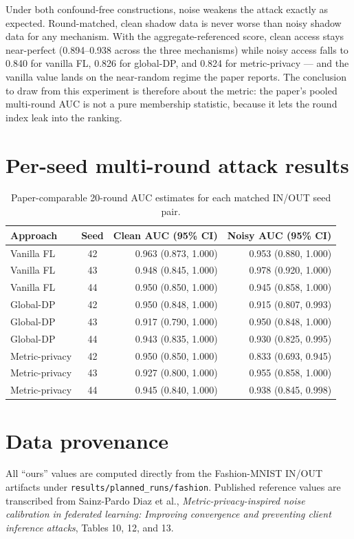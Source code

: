 \documentclass[10pt]{article}
\begin{document}
Under both confound-free constructions, noise weakens the attack exactly as expected. Round-matched, clean
shadow data is never worse than noisy shadow data for any mechanism. With the aggregate-referenced score, clean access
stays near-perfect (0.894--0.938 across the three mechanisms) while noisy access falls to
0.840 for vanilla FL, 0.826 for global-DP, and
0.824 for metric-privacy --- and the vanilla value lands on the near-random
regime the paper reports. The conclusion to draw from this experiment is therefore about the metric: the paper's
pooled multi-round AUC is not a pure membership statistic, because it lets the round index leak into the
ranking.

\clearpage
\section*{Per-seed multi-round attack results}
\begin{table}[h]
\centering
\caption{Paper-comparable 20-round AUC estimates for each matched IN/OUT seed pair.}
\begin{tabular}{lcrr}
\toprule
Approach & Seed & Clean AUC (95\% CI) & Noisy AUC (95\% CI) \\
\midrule
Vanilla FL & 42 & 0.963 (0.873, 1.000) & 0.953 (0.880, 1.000) \\
Vanilla FL & 43 & 0.948 (0.845, 1.000) & 0.978 (0.920, 1.000) \\
Vanilla FL & 44 & 0.950 (0.850, 1.000) & 0.945 (0.858, 1.000) \\
\midrule
Global-DP & 42 & 0.950 (0.848, 1.000) & 0.915 (0.807, 0.993) \\
Global-DP & 43 & 0.917 (0.790, 1.000) & 0.950 (0.848, 1.000) \\
Global-DP & 44 & 0.943 (0.835, 1.000) & 0.930 (0.825, 0.995) \\
\midrule
Metric-privacy & 42 & 0.950 (0.850, 1.000) & 0.833 (0.693, 0.945) \\
Metric-privacy & 43 & 0.927 (0.800, 1.000) & 0.955 (0.858, 1.000) \\
Metric-privacy & 44 & 0.945 (0.840, 1.000) & 0.938 (0.845, 0.998) \\
\bottomrule
\end{tabular}
\end{table}

\section*{Data provenance}
All ``ours'' values are computed directly from the Fashion-MNIST IN/OUT artifacts under
\texttt{results/planned\_runs/fashion}. Published reference values are transcribed from
Sainz-Pardo Diaz et al., \emph{Metric-privacy-inspired noise calibration in federated learning:
Improving convergence and preventing client inference attacks}, Tables 10, 12, and 13.
\end{document}
